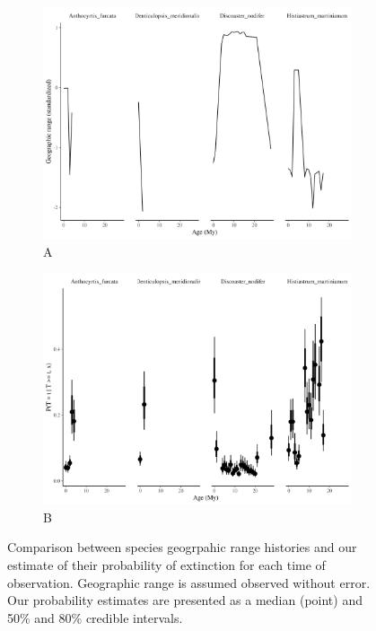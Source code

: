 \documentclass[12pt,letterpaper]{article}
\begin{document}
\begin{figure}[ht]
  \centering
  \begin{subfigure}{\textwidth}
    \includegraphics[width=\textwidth,height=0.5\textheight,keepaspectratio=true]{../results/figure/relrisk_range}
    \caption{A}
    \label{fig:relrisk_range}
  \end{subfigure}

  \begin{subfigure}{\textwidth}
    \includegraphics[width=\textwidth,height=0.5\textheight,keepaspectratio=true]{../results/figure/relrisk_ext}
    \caption{B}
    \label{fig:relrisk_ext}
  \end{subfigure}
  \caption{Comparison between species geogrpahic range histories and our estimate of their probability of extinction for each time of observation. Geographic range is assumed observed without error. Our probability estimates are presented as a median (point) and 50\% and 80\% credible intervals.}
  \label{fig:relrisk_compare}
\end{figure}
\end{document}
